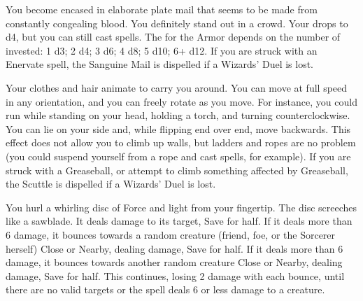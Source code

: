{You become encased in elaborate plate mail that seems to be made from
constantly congealing blood.  You definitely stand out in a crowd. Your \MD
drops to d4, but you can still cast spells.  The \UD for the Armor depends
on the number of \DICE invested: 1 d3; 2 d4; 3 d6; 4 d8; 5 d10; 6+ d12.  If
you are struck with an Enervate spell, the Sanguine Mail is dispelled if a
Wizards' Duel is lost.





\SPELL[
  Name=Scuttle,
  Link=wizardry-scuttle,
  Paradigm=Biomancy,
  Save=N,
  Duration=Combat or \SUMDICE Minutes,
  Counter=\mylink{Greaseball}{wizardry-greaseball} ,
  Keywords=None,
  Target=Self
]



Your clothes and hair animate to carry you around. You can move at full
speed in any orientation, and you can freely rotate as you move. For
instance, you could run while standing on your head, holding a torch, and
turning counterclockwise. You can lie on your side and, while flipping end
over end, move backwards. This effect does not allow you to climb up walls,
but ladders and ropes are no problem (you could suspend yourself from a rope
and cast spells, for example).  If you are struck with a Greaseball, or
attempt to climb something affected by Greaseball, the Scuttle is dispelled
if a Wizards' Duel is lost.




\SPELL[
  Name=Scything Disc of Nog,
  Link=wizardry-scything-disc-of-nog,
  Paradigm=Force,
  Save=Y (half),
  Duration=0,
  Counter=n/a ,
  Keywords=None,
  Target=Nearby or Far Away Area
]



You hurl a whirling disc of Force and light from your fingertip. The disc
screeches like a sawblade. It deals \SUMDICE damage to its target, Save for
half. If it deals more than 6 damage, it bounces towards a random creature
(friend, foe, or the Sorcerer herself) Close or Nearby, dealing 
damage, Save for half. If it deals more than 6 damage, it bounces towards
another random creature Close or Nearby, dealing  damage, Save for
half. This continues, losing 2 damage with each bounce, until there are no
valid targets or the spell deals 6 or less damage to a creature.





\SPELL[
  Name=Sleep,
  Link=wizardry-sleep,
  Paradigm=Mind,
  Save=Y (negate),
  Duration=Markovian,
  Counter=\mylink{Cacaphony}{wizardry-cacaphony} ,
  Keywords=None,
  Target=Close or Nearby Area
]



}
